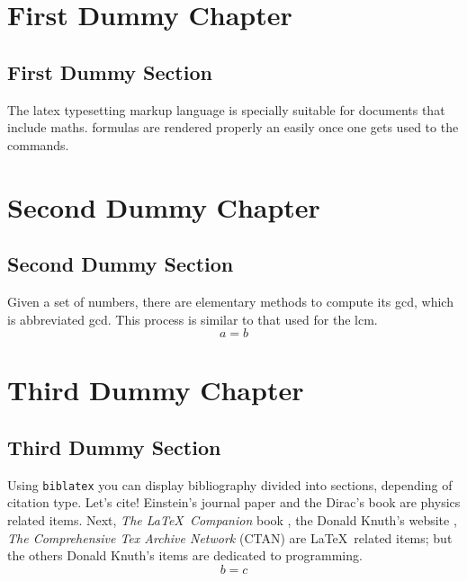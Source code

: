 \chapter{First Dummy Chapter}
\section{First Dummy  Section}
The \Gls{latex} typesetting markup language is specially suitable for documents
that include \gls{maths}. \Glspl{formula} are rendered properly an easily once
one gets used to the commands.

\clearpage
\chapter{Second Dummy Chapter}
\section{Second Dummy  Section}
Given a set of numbers, there are elementary methods to compute its
\acrlong{gcd}, which is abbreviated \acrshort{gcd}. This process is similar
to that used for the \acrfull{lcm}.
\begin{equation}\label{eq:Eq1}
    a=b
\end{equation}

\clearpage
\chapter{Third Dummy Chapter}
\section{Third Dummy Section}
Using \texttt{biblatex} you can display bibliography divided into sections,
depending of citation type.
Let's cite! Einstein's journal paper \cite{einstein} and the Dirac's book
\cite{dirac} are physics related items.
Next, \textit{The \LaTeX\ Companion} book \cite{latexcompanion}, the Donald 
Knuth's website \cite{knuthwebsite}, \textit{The Comprehensive Tex Archive 
Network} (CTAN) \cite{ctan} are \LaTeX\ related items; but the others Donald 
Knuth's items \cite{knuth-fa,knuth-acp} are dedicated to programming. 
\begin{equation}\label{eq:Eq2}
    b=c
\end{equation}
